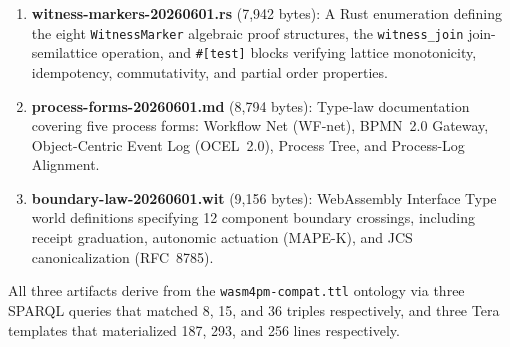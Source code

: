 \begin{enumerate}
  \item \textbf{witness-markers-20260601.rs} (7{,}942 bytes): A Rust enumeration defining
    the eight \texttt{WitnessMarker} algebraic proof structures, the \texttt{witness\_join}
    join-semilattice operation, and \texttt{\#[test]} blocks verifying lattice monotonicity,
    idempotency, commutativity, and partial order properties.
  \item \textbf{process-forms-20260601.md} (8{,}794 bytes): Type-law documentation covering
    five process forms: Workflow Net (WF-net), BPMN~2.0 Gateway, Object-Centric Event Log
    (OCEL~2.0), Process Tree, and Process-Log Alignment.
  \item \textbf{boundary-law-20260601.wit} (9{,}156 bytes): WebAssembly Interface Type
    world definitions specifying 12 component boundary crossings, including receipt graduation,
    autonomic actuation (MAPE-K), and JCS canonicalization (RFC~8785).
\end{enumerate}

All three artifacts derive from the \texttt{wasm4pm-compat.ttl} ontology via three SPARQL
queries that matched 8, 15, and 36 triples respectively, and three Tera templates that
materialized 187, 293, and 256 lines respectively.
